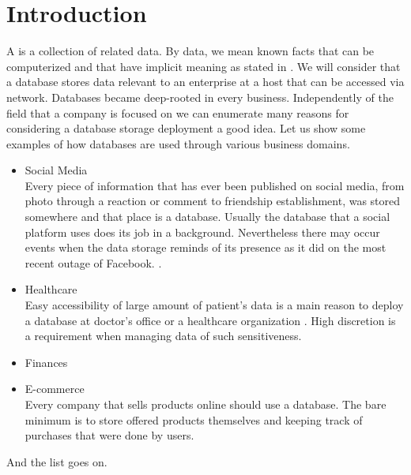 \chapter{Introduction}

\par 
A  is a collection of related data. By data, we mean known facts that can be computerized and that have implicit meaning as stated in  \cite{ElmasryNavathe15}. We will consider that a database stores data relevant to an enterprise at a host that can be accessed via network.
Databases became deep-rooted in every business. 
Independently of the field that a company is focused on we can enumerate many reasons for considering a database storage deployment a good idea.
Let us show some examples of how databases are used through various business domains.

\begin{itemize}
	
	\item Social Media \\
	Every piece of information that has ever been published on social media, from photo through a reaction or comment to friendship establishment, was stored somewhere and that place is a database. Usually the database that a social platform uses does its job in a background. Nevertheless there may occur events when the data storage reminds of its presence as it did on the most recent outage of Facebook. \cite{Facebook19}.
	
	\item Healthcare \\
	Easy accessibility of large amount of patient's data is a main reason to deploy a database at doctor's office or a healthcare organization \cite{Healthcare13}. High discretion is a requirement when managing data of such sensitiveness.
	
	\item Finances \\
	
	\item E-commerce \\
	Every company that sells products online should use a database. The bare minimum is to store offered products themselves and keeping track of purchases that were done by users.
	
	
\end{itemize}
And the list goes on.
 \\

